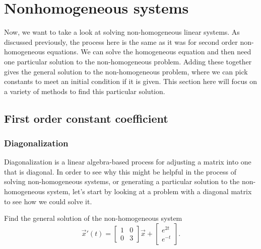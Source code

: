 \section{Nonhomogeneous systems}
\label{nonhomogsys:section}



Now, we want to take a look at solving non-homogeneous linear systems. As discussed previously, the process here is the same as it was for second order non-homogeneous equations. We can solve the homogeneous equation and then need one particular solution to the non-homogeneous problem. Adding these together gives the general solution to the non-homogeneous problem, where we can pick constants to meet an initial condition if it is given. This section here will focus on a variety of methods to find this particular solution.

\subsection{First order constant coefficient}

\subsubsection{Diagonalization}


Diagonalization is a linear algebra-based process for adjusting a matrix into one that is diagonal. In order to see why this might be helpful in the process of solving non-homogeneous systems, or generating a particular solution to the non-homogeneous system, let's start by looking at a problem with a diagonal matrix to see how we could solve it. 

\begin{example}
Find the general solution of the non-homogeneous system
\[ \vec{x}'(t) = \begin{bmatrix}1& 0 \\ 0 & 3 \end{bmatrix}\vec{x} + \begin{bmatrix} e^{2t} \\ e^{-t} \end{bmatrix}.\]
\end{example}

